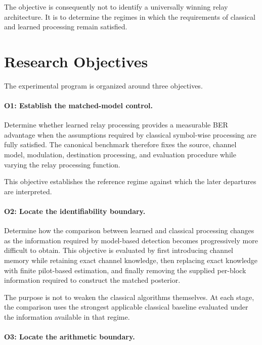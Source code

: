 The objective is consequently not to identify a universally winning relay
architecture. It is to determine the regimes in which the requirements of
classical and learned processing remain satisfied.


\section{Research Objectives}
\label{sec:research-objectives-detail}

The experimental program is organized around three objectives.

\paragraph{O1: Establish the matched-model control.}

Determine whether learned relay processing provides a measurable BER advantage
when the assumptions required by classical symbol-wise processing are fully
satisfied. The canonical benchmark therefore fixes the source, channel model,
modulation, destination processing, and evaluation procedure while varying the
relay processing function.

This objective establishes the reference regime against which the later
departures are interpreted.

\paragraph{O2: Locate the identifiability boundary.}

Determine how the comparison between learned and classical processing changes
as the information required by model-based detection becomes progressively
more difficult to obtain. This objective is evaluated by first introducing
channel memory while retaining exact channel knowledge, then replacing exact
knowledge with finite pilot-based estimation, and finally removing the
supplied per-block information required to construct the matched posterior.

The purpose is not to weaken the classical algorithms themselves. At each
stage, the comparison uses the strongest applicable classical baseline
evaluated under the information available in that regime.

\paragraph{O3: Locate the arithmetic boundary.}

